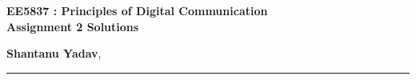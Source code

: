 \documentclass[11pt]{article}
\begin{document}
 \begin{center}
         {\LARGE \bf
	 EE5837 : Principles of Digital Communication \\
             Assignment 2 Solutions 
         }
 \end{center}
 \vspace{1ex}
 \begin{center}
	 {\Large \bf Shantanu Yadav}, 
 \end{center}
 \begin{center}
	 \hrule
 \end{center}
 \vspace{1ex}
\end{document}
